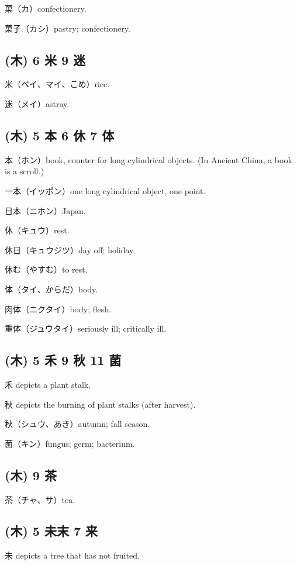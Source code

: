 菓（カ）confectionery.

菓子（カシ）pastry; confectionery.

\subsection{(木) 6 米 9 迷}

米（ベイ、マイ、こめ）rice.

迷（メイ）astray.

\subsection{(木) 5 本 6 休 7 体}

本（ホン）book, counter for long cylindrical objects.
(In Ancient China, a book is a scroll.)

一本（イッポン）one long cylindrical object, one point.

日本（ニホン）Japan.

休（キュウ）rest.

休日（キュウジツ）day off; holiday.

休む（やすむ）to rest.

体（タイ、からだ）body.

肉体（ニクタイ）body; flesh.

重体（ジュウタイ）seriously ill; critically ill.

\subsection{(木) 5 禾 9 秋 11 菌}

禾 depicts a plant stalk.

秋 depicts the burning of plant stalks (after harvest).

秋（シュウ、あき）autumn; fall season.

菌（キン）fungus; germ; bacterium.

\subsection{(木) 9 茶}

茶（チャ、サ）tea.

\subsection{(木) 5 未末 7 来}

未 depicts a tree that has not fruited.

